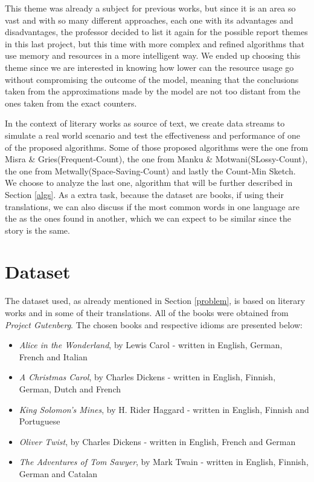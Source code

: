 \documentclass[shortpaper]{revdetua}
\begin{document}
This theme was already a subject for previous works, but since it is an area so vast and with so many different approaches, each one with its advantages and disadvantages, the professor decided to list it again for the possible report themes in this last project, but this time with more complex and refined algorithms that use memory and resources in a more intelligent way. We ended up choosing this theme since we are interested in knowing how lower can the resource usage go without compromising the outcome of the model, meaning that the conclusions taken from the approximations made by the model are not too distant from the ones taken from the exact counters.

In the context of literary works as source of text, we create data streams to simulate a real world scenario and test the effectiveness and performance of one of the proposed algorithms. Some of those proposed algorithms were the one from Misra \& Gries(Frequent-Count), the one from Manku \& Motwani(SLossy-Count), the one from Metwally(Space-Saving-Count) and lastly the Count-Min Sketch. We choose to analyze the last one, algorithm that will be further described in Section \ref{algs}.
As a extra task, because the dataset are books, if using their translations, we can also discuss if the most common words in one language are the as the ones found in another, which we can expect to be similar since the story is the same.


\section{Dataset}\label{dataset}

The dataset used, as already mentioned in Section \ref{problem}, is based on literary works and in some of their translations. All of the books were obtained from \textit{Project Gutenberg}\cite{gutenberg}. The chosen books and respective idioms are presented below:

\begin{itemize}
    \item \textit{Alice in the Wonderland}, by Lewis Carol - written in English, German, French and Italian
    \item \textit{A Christmas Carol}, by Charles Dickens - written in English, Finnish, German, Dutch and French
    \item \textit{King Solomon's Mines}, by H. Rider Haggard - written in English, Finnish and Portuguese
    \item \textit{Oliver Twist}, by Charles Dickens - written in English, French and German
    \item \textit{The Adventures of Tom Sawyer}, by Mark Twain - written in English, Finnish, German and Catalan
\end{itemize}
\end{document}
